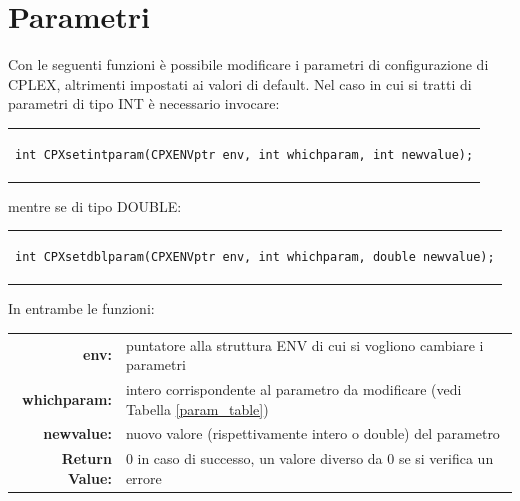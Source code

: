 \section{Parametri}\label{param}
Con le seguenti funzioni è possibile modificare i parametri di configurazione di CPLEX, altrimenti impostati ai valori di default.
Nel caso in cui si tratti di parametri di tipo INT è necessario invocare:\\
\begin{center}
\begin{tabular}{c}
\begin{lstlisting}[linewidth=330pt, basicstyle=\footnotesize\sffamily,]     
int CPXsetintparam(CPXENVptr env, int whichparam, int newvalue);
\end{lstlisting}
\end{tabular}
\end{center}
mentre se di tipo DOUBLE:\\
\begin{center}
\begin{tabular}{c}
\begin{lstlisting}[linewidth=340pt, basicstyle=\footnotesize\sffamily,]  
int CPXsetdblparam(CPXENVptr env, int whichparam, double newvalue);
\end{lstlisting}
\end{tabular}
\end{center}
In entrambe le funzioni:
\begin{table}[h]
\centering
\begin{tabular}{rl}
\textbf{env:} & {puntatore alla struttura ENV di cui si vogliono cambiare i parametri}\\
\textbf{whichparam:} & {intero corrispondente al parametro da modificare (vedi Tabella \ref{param_table})}\\
\textbf{newvalue:} & {nuovo valore (rispettivamente intero o double) del parametro}\\
\textbf{Return Value:} & {0 in caso di successo, un valore diverso da 0 se si verifica un errore}\\
\end{tabular}
\end{table}
